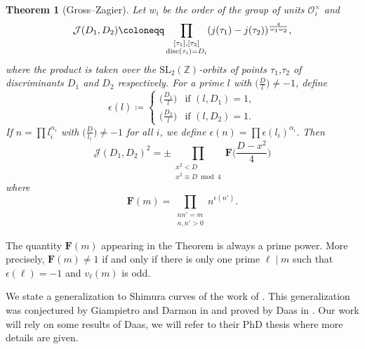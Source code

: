 \documentclass[a4paper,12pt]{article}
\newtheorem{theorem}{Theorem}
\begin{document}
\begin{theorem}[Gross--Zagier]\label{GZ}
     Let $w_i$ be the order of the group of units $\mathcal{O}_{i}^\times$ and 
    \begin{equation}
   \mathcal{J}(D_1,D_2)\coloneqq \prod_{\substack{[\tau_1],[\tau_2]\\ \textup{disc}(\tau_i)=D_i}}(j(\tau_1)-j(\tau_2))^{\frac{4}{w_1w_2}}, 
   \end{equation}
where the product is taken over the $\mathrm{SL}_2(\mathbb{Z})$-orbits of points $\tau_1$,$\tau_2$ of discriminants $D_1$ and $D_2$ respectively. For a prime $l$ with $\bigl(\frac{D}{l}\bigl)\neq -1$, define 
\[\epsilon(l)\coloneqq \begin{cases}
      \bigl(\frac{D_1}{l}\bigl) & \text{if  } (l,D_1)=1,\\
      \bigl(\frac{D_2}{l}\bigl) & \text{if  } (l,D_2)=1.
      \end{cases}\]
If $n=\prod l_i^{\alpha_i}$ with $\bigl(\frac{D}{l_i}\bigl)\neq -1$ for all $i$, we define $\epsilon(n)=\prod \epsilon(l_i)^{\alpha_i}$. Then
\begin{equation}
\mathcal{J}(D_1,D_2)^2=\pm \prod_{\substack{x^2<D\\ x^2\equiv D\bmod{4}}}\mathbf{F}\biggl(\frac{D-x^2}{4}\biggl)
\end{equation}
where 
\begin{equation}
\mathbf{F}(m)=\prod_{\substack{nn'=m\\ n,n'>0}}n^{\epsilon(n')}.
\end{equation}
\end{theorem}
 The quantity $\mathbf{F}(m)$ appearing in the Theorem is always a prime power. More precisely, $\mathbf{F}(m)\neq 1$ if and only if  there is only one prime $\ell\mid m$ such that $\epsilon(\ell)=-1$ and $v_\ell(m)$ is odd.
 \\
 \par
We state a generalization to Shimura curves of the work of \cite{GrossZagier84}. This generalization was conjectured by Giampietro and Darmon in \cite{GiampetroDarmon} and proved by Daas in \cite{Daasarticle}. Our work will rely on some results of Daas, we will refer to their PhD thesis \cite{Daas} where more details are given.
\end{document}
